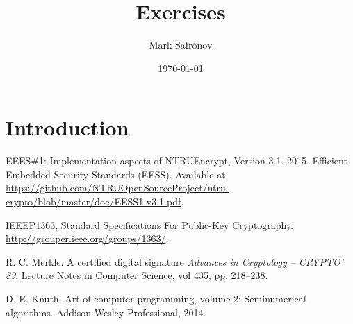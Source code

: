 \documentclass[11pt, a4paper]{report}
\title{Exercises}
\author{Mark Safrónov}
\date{\today}
\begin{document}


\tableofcontents

\section{Introduction}








%

\begin{thebibliography}{11}

EEES\#1: Implementation aspects of NTRUEncrypt, Version 3.1.
2015. Efficient Embedded Security Standards (EESS). 
Available at
\url{https://github.com/NTRUOpenSourceProject/ntru-crypto/blob/master/doc/EESS1-v3.1.pdf}.

IEEEP1363, Standard Specifications For Public-Key Cryptography. 
\url{http://grouper.ieee.org/groups/1363/}.

R. C. Merkle.
A certified digital signature
\emph{Advances in Cryptology -- CRYPTO’ 89}, Lecture Notes in Computer Science, vol 435, pp. 218--238.
	
D. E. Knuth. 
Art of computer programming, volume 2: Seminumerical algorithms. 
Addison-Wesley Professional, 2014.

\end{thebibliography}
\end{document}
